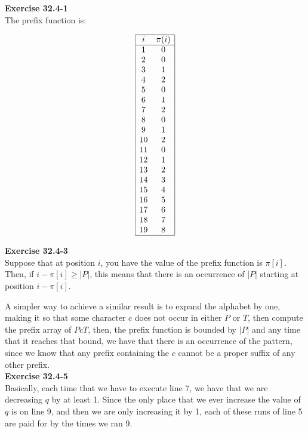 \documentclass{article}
\begin{document}
\noindent\textbf{Exercise 32.4-1}\\

The prefix function is:

\[
\begin{array}{|cc|}
\hline
i &\pi(i)\\
\hline
1&0\\
2&0\\
3&1\\
4&2\\
5&0\\
6&1\\
7&2\\
8&0\\
9&1\\
10&2\\
11&0\\
12&1\\
13&2\\
14&3\\
15&4\\
16&5\\
17&6\\
18&7\\
19&8\\
\hline
\end{array}
\]




\noindent\textbf{Exercise 32.4-3}\\

Suppose that at position $i$, you have the value of the prefix function is $\pi[i]$. Then, if $i-\pi[i] \ge|P| $, this means that there is an occurrence of $|P|$ starting at position $i-\pi[i]$. 

A simpler way to achieve a similar result is to expand the alphabet by one, making it so that some character $c$ does not occur in either $P$ or $T$, then compute the prefix array of $PcT$, then, the prefix function is bounded by $|P|$ and any time that it reaches that bound, we have that there is an occurrence of the pattern, since we know that any prefix containing the $c$ cannot be a proper suffix of any other prefix.\\


\noindent\textbf{Exercise 32.4-5}\\

Basically, each time that we have to execute line 7, we have that we are decreasing $q$ by at least 1. Since the only place that we ever increase the value of $q$ is on line 9, and then we are only increasing it by 1, each of these runs of line 5 are paid for by the times we ran 9.
\end{document}
